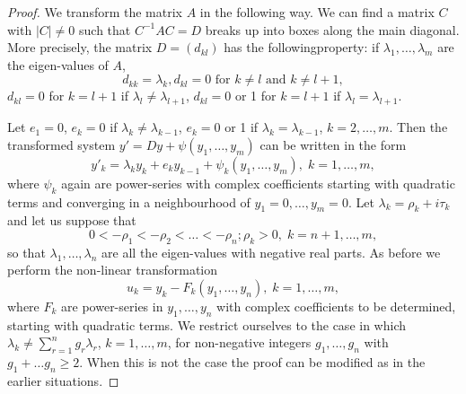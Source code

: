 \begin{proof}
We transform the matrix $A$ in the following way. We can find a matrix
$C$ with $|C| \neq 0$ such that $C^{-1} AC = D$ breaks up into boxes
along the main diagonal. More precisely, the matrix $D = (d_{kl})$ has
the following\pageoriginale property: if $\lambda_1, \ldots,
\lambda_m$ are the eigen-values of $A$,  
\begin{equation*}
d_{kk} = \lambda_k, d_{kl} = 0 \text{ for } k \neq l \text{ and } k
\neq l +1 , \tag{3.5.55}\label{chap3:eq3.5.55} 
\end{equation*}
$d_{kl} = 0$ for $k = l +1$ if $\lambda_l \neq \lambda_{l+1}$, $d_{kl}
= 0$ or 1 for $k =l+1$ if $\lambda_l = \lambda_{l+1}$. 

Let $e_1 = 0$, $e_k = 0$ if $\lambda_k \neq \lambda_{k-1}$, $e_k = 0$
or 1 if $\lambda_k = \lambda_{k-1}$, $k = 2, \ldots, m$. Then the
transformed system $y' = Dy + \psi (y_1,\ldots, y_m)$ can be written
in the form 
\begin{equation*}
y'_k = \lambda_k y_k + e_k y_{k-1}  + \psi_k(y_1, \ldots, y_m), \;k =
1, \ldots, m, \tag{3.5.56}\label{chap3:eq3.5.56} 
\end{equation*}
where $\psi_k$ again are power-series with complex coefficients
starting with quadratic terms and converging in a neighbourhood of
$y_1 = 0, \ldots, y_m =0$. Let $\lambda_k = \rho_k + i \tau_k $ and
let us suppose that  
\begin{equation*}
0 < - \rho_1 < - \rho_2 < \ldots < - \rho_n ; \rho_k > 0, \; k =
n+1,\ldots,m,\tag{3.5.57}\label{chap3:eq3.5.57} 
\end{equation*}
so that $\lambda_1, \ldots, \lambda_n$ are all the eigen-values with
negative real parts. As before we perform the non-linear
transformation 
\begin{equation*}
u_k = y_k - F_k (y_1,\ldots, y_n) , \; k =1, \ldots, m,
\tag{3.5.58}\label{chap3:eq3.5.58} 
\end{equation*}
where $F_k$ are power-series in $y_1, \ldots, y_n$ with complex
coefficients to be determined, starting with quadratic terms. We
restrict ourselves to the case in which $\lambda_k \neq
\sum\limits^n_{r=1} g_r \lambda_r$, $k =1, \ldots, m$, for
non-negative integers $g_1,\ldots, g_n$ with $g_1 + \ldots g_n \geq
2$. When this is not the case the proof can be modified as in the
earlier situations. 


\end{proof}
